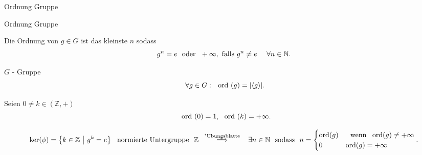 \documentclass[class=article, crop=false]{standalone}
\begin{document}
\begin{zettel}{Ordnung Gruppe}
\begin{flashcard}[f7f4h3u3]{Ordnung Gruppe}
	\begin{definition}[Ordnung]
		Die Ordnung von $g \in  G$ ist das kleinste $n$ sodass
		\[
			g^n  = e \tx{ oder } +\infty, \text{ falls } g^n  \neq  e \quad \forall n \in  \mathbb{N}
		.\]
	\end{definition}
\end{flashcard}
\begin{theorem}
	$G$ - Gruppe
	\[
		\forall g \in  G : \tx{ ord}(g) = |\langle g \rangle|
	.\]
\end{theorem}
\begin{example}
	Seien $0 \neq k \in  (\mathbb{Z}, +)$
	\[
		\tx{ ord}(0) = 1, \tx{ ord}(k) = + \infty
	.\]
\end{example}

\begin{theorem}
	\[
		\ker (\phi) =  \set{k \in  \mathbb{Z}}{g^k =  e} \tx{ normierte Untergruppe }  \mathbb{Z} \stackrel{\tx{ "Ubungsblatte } }{\implies} \exists n \in  \mathbb{N} \tx{ sodass } n =  \begin{cases}
			\ord(g) & \tx{  wenn } \ord(g) \neq + \infty \\
			0       & \ord(g) =  + \infty                \\
		\end{cases}
	.\]

\end{theorem}
\end{zettel}
\end{document}
